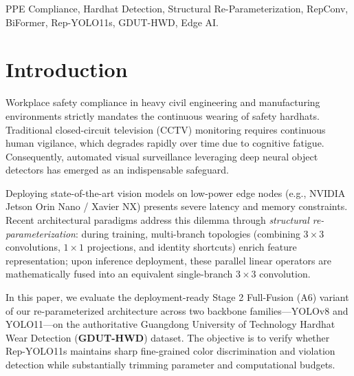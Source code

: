 \documentclass[conference]{IEEEtran}
\begin{document}
\begin{IEEEkeywords}
PPE Compliance, Hardhat Detection, Structural Re-Parameterization, RepConv, BiFormer, Rep-YOLO11s, GDUT-HWD, Edge AI.
\end{IEEEkeywords}

\section{Introduction}
Workplace safety compliance in heavy civil engineering and manufacturing environments strictly mandates the continuous wearing of safety hardhats. Traditional closed-circuit television (CCTV) monitoring requires continuous human vigilance, which degrades rapidly over time due to cognitive fatigue. Consequently, automated visual surveillance leveraging deep neural object detectors has emerged as an indispensable safeguard.

Deploying state-of-the-art vision models on low-power edge nodes (e.g., NVIDIA Jetson Orin Nano / Xavier NX) presents severe latency and memory constraints. Recent architectural paradigms address this dilemma through \textit{structural re-parameterization}: during training, multi-branch topologies (combining $3\times3$ convolutions, $1\times1$ projections, and identity shortcuts) enrich feature representation; upon inference deployment, these parallel linear operators are mathematically fused into an equivalent single-branch $3\times3$ convolution.

In this paper, we evaluate the deployment-ready Stage 2 Full-Fusion (A6) variant of our re-parameterized architecture across two backbone families---YOLOv8 and YOLO11---on the authoritative Guangdong University of Technology Hardhat Wear Detection (\textbf{GDUT-HWD}) dataset. The objective is to verify whether Rep-YOLO11s maintains sharp fine-grained color discrimination and violation detection while substantially trimming parameter and computational budgets.
\end{document}
